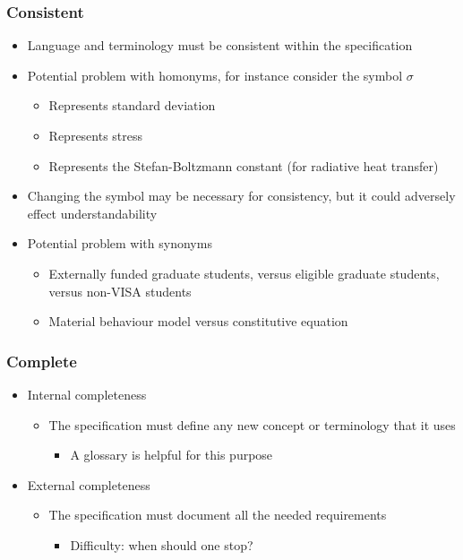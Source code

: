 \documentclass[t,12pt,numbers,fleqn]{beamer}
\begin{document}
\begin{frame}
\frametitle{Consistent}

\begin{itemize}

\item Language and terminology must be consistent within the specification
\item Potential problem with homonyms, for instance consider the symbol $\sigma$
\begin{itemize}
\item Represents standard deviation
\item Represents stress
\item Represents the Stefan-Boltzmann constant (for radiative heat transfer)
\end{itemize}
\item Changing the symbol may be necessary for consistency, but it could
  adversely effect understandability
\item Potential problem with synonyms
\begin{itemize}
\item Externally funded graduate students, versus eligible graduate students,
  versus non-VISA students
\item Material behaviour model versus constitutive equation
\end{itemize}
\end{itemize}

\end{frame}


\begin{frame}
\frametitle{Complete}

\begin{itemize}

\item Internal completeness
\begin{itemize}
\item The specification must define any new concept or terminology that it uses
\begin{itemize}
\item A glossary is helpful for this purpose
\end{itemize}
\end{itemize}
\item External completeness
\begin{itemize}
\item The specification must document all the needed requirements
\begin{itemize}
\item Difficulty: when should one stop?
\end{itemize}
\end{itemize}

\end{itemize}

\end{frame}
\end{document}
